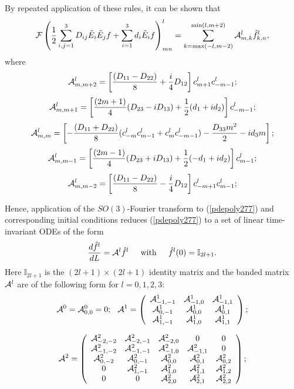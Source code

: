 \documentclass{svmult}
\def\half{ {1\over 2} }
\newcommand{\II}{\mathbb{I}}
\begin{document}
By repeated application of these rules, it can be shown that \cite{dover}
$$ {\cal F}\left(\half \sum_{i,j=1}^{3} D_{ij} \tilde{E}_i \tilde{E}_j f
+ \sum_{i=1}^{3} d_{i} \tilde{E}_i f\right)_{mn}^{l} =
\sum_{k={\rm max}(-l,m-2)}^{{\rm min}(l,m+2)} {\cal A}_{m,k}^{l} \hat{f}_{k,n}^{l}, $$
where
$$ {\cal A}_{m,m+2}^{l} = \left[\frac{(D_{11}-D_{22})}{8} + \frac{i}{4} D_{12} \right] c_{m+1}^{l} c_{-m-1}^{l}; $$
$$ {\cal A}_{m,m+1}^{l} = \left[\frac{(2m+1)}{4} (D_{23}
-i D_{13}) + \half (d_1 + i d_2) \right]c_{-m-1}^{l}; $$
$$ {\cal A}_{m,m}^{l} = \left[
-\frac{(D_{11}+D_{22})}{8}
(c_{-m}^{l} c_{m-1}^{l} + c_{m}^{l} c_{-m-1}^{l})
-\frac{D_{33} m^2}{2} -i d_3 m
\right];$$
$$ {\cal A}_{m,m-1}^{l} = \left[\frac{(2m-1)}{4}(D_{23} + i D_{13})
 + \half (-d_1 + i d_2) \right]c_{m-1}^{l}; $$
$$ {\cal A}_{m,m-2}^{l} = \left[
\frac{(D_{11}-D_{22})}{8}
-\frac{i}{4} D_{12}
\right] c_{-m+1}^{l} c_{m-1}^{l}; $$

Hence, application of the $SO(3)$-Fourier transform to
(\ref{pdepoly277}) and corresponding initial conditions
reduces (\ref{pdepoly277}) to a set of linear time-invariant
ODEs of the form
\begin{equation}
\frac{d\hat{f}^{l}}{dL} = {\cal A}^{l} \hat{f}^{l} \hskip 0.2 true in
{\rm with}
\hskip 0.2 true in
\hat{f}^{l}(0) = \II_{2l+1}.
\label{rotodes}
\end{equation}
Here $\II_{2l+1}$ is the $(2l+1)\times(2l+1)$ identity
matrix and the banded matrix ${\cal A}^{l}$ are of the following
form for
$l=0,1, 2,3$:
$${\cal A}^{0} = {\cal A}_{0,0}^{0} = 0; \hskip 0.1 true in
{\cal A}^{1} = \left(\begin{array}{ccc}
{\cal A}_{-1,-1}^{1} & {\cal A}_{-1,0}^{1} & {\cal A}_{-1,1}^{1} \\
{\cal A}_{0,-1}^{1} & {\cal A}_{0,0}^{1} & {\cal A}_{0,1}^{1} \\
{\cal A}_{1,-1}^{1} & {\cal A}_{1,0}^{1} & {\cal A}_{1,1}^{1} \end{array} \right); $$

$$ {\cal A}^{2} = \left(\begin{array}{ccccc}
{\cal A}_{-2,-2}^{2} & {\cal A}_{-2,-1}^{2} & {\cal A}_{-2,0}^{2} & 0 & 0 \\
{\cal A}_{-1,-2}^{2} & {\cal A}_{-1,-1}^{2} & {\cal A}_{-1,0}^{2} & {\cal A}_{-1,1}^{2} & 0 \\
{\cal A}_{0,-2}^{2} &
{\cal A}_{0,-1}^{2} & {\cal A}_{0,0}^{2} & {\cal A}_{0,1}^{2} & {\cal A}_{0,2}^{2} \\
0 & {\cal A}_{1,-1}^{2} & {\cal A}_{1,0}^{2} & {\cal A}_{1,1}^{2} & {\cal A}_{1,2}^{2} \\
0 & 0 & {\cal A}_{2,0}^{2} & {\cal A}_{2,1}^{2} & {\cal A}_{2,2}^{2}
\end{array} \right); $$
\end{document}
